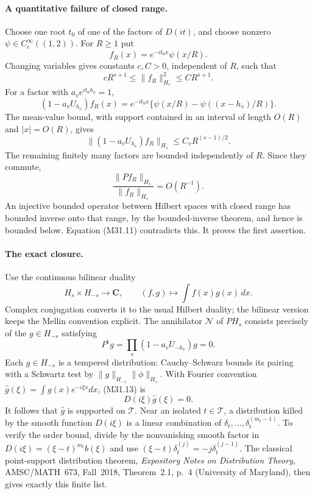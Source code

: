 \paragraph{A quantitative failure of closed range.}
Choose one root $t_0$ of one of the factors of $D(it)$,
and choose nonzero $\psi\in C_c^\infty((1,2))$.
For $R\geq1$ put
\[
             f_R(x)=e^{-it_0x}\psi(x/R).
 \tag{M31.8}
\]
Changing variables gives constants $c,C>0$, independent of $R$,
such that
\[
      cR^{s+1}\leq\|f_R\|_{H_s}^2\leq CR^{s+1}.
 \tag{M31.9}
\]
For a factor with $a_ve^{it_0h_v}=1$,
\[
 (1-a_vU_{h_v})f_R(x)
   =e^{-it_0x}\{\psi(x/R)-\psi((x-h_v)/R)\}.
 \tag{M31.10}
\]
The mean-value bound, with support contained in an interval
of length $O(R)$ and $|x|=O(R)$, gives
\[
 \|(1-a_vU_{h_v})f_R\|_{H_s}
      \leq C_vR^{(s-1)/2}.
\]
The remaining finitely many factors are bounded independently
of $R$.  Since they commute,
\[
       \frac{\|Pf_R\|_{H_s}}{\|f_R\|_{H_s}}=O(R^{-1}).
 \tag{M31.11}
\]
An injective bounded operator between Hilbert spaces with
closed range has bounded inverse onto that range, by the
bounded-inverse theorem, and hence is bounded below.  Equation
(M31.11) contradicts this.  It proves the first assertion.

\paragraph{The exact closure.}
Use the continuous bilinear duality
\[
       H_s\times H_{-s}\longrightarrow\mathbf C,
       \qquad(f,g)\longmapsto\int f(x)g(x)\,dx.
 \tag{M31.12}
\]
Complex conjugation converts it to the usual Hilbert duality;
the bilinear version keeps the Mellin convention explicit.
The annihilator $\mathcal N$ of $PH_s$ consists precisely of
the $g\in H_{-s}$ satisfying
\[
          P^{\mathrm t}g=
             \prod_v(1-a_vU_{-h_v})g=0.
 \tag{M31.13}
\]
Each $g\in H_{-s}$ is a tempered distribution: Cauchy--Schwarz
bounds its pairing with a Schwartz test by
$\|g\|_{H_{-s}}\|\phi\|_{H_s}$.  With Fourier convention
$\widehat g(\xi)=\int g(x)e^{-i\xi x}dx$, (M31.13) is
\[
                         D(i\xi)\widehat g(\xi)=0.
 \tag{M31.14}
\]
It follows that $\widehat g$ is supported on $\mathcal T$.
Near an isolated $t\in\mathcal T$, a distribution killed
by the smooth function $D(i\xi)$ is a linear combination
of $\delta_t,\ldots,\delta_t^{(m_t-1)}$.  To verify the
order bound, divide by the nonvanishing smooth factor in
$D(i\xi)=(\xi-t)^{m_t}b(\xi)$ and use
$(\xi-t)\delta_t^{(j)}=-j\delta_t^{(j-1)}$.
The classical point-support distribution theorem,
\emph{Expository Notes on Distribution Theory}, AMSC/MATH~673,
Fall~2018, Theorem~2.1, p.~4 (University of Maryland),
then gives exactly this finite list.

